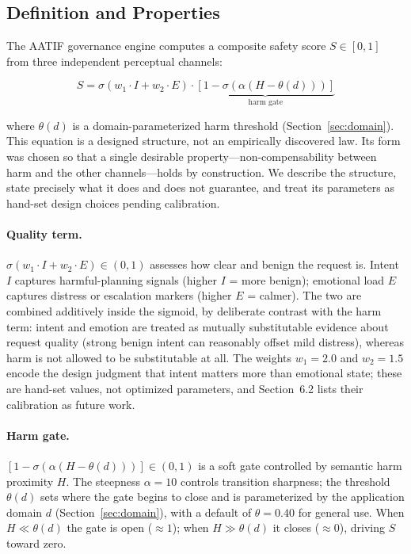 \documentclass[11pt,a4paper]{article}
\begin{document}
\subsection{Definition and Properties}

The AATIF governance engine computes a composite safety score $S \in [0,1]$ from three independent perceptual channels:

\begin{equation}
S = \sigma(w_1 \cdot I + w_2 \cdot E) \cdot \underbrace{[1 - \sigma(\alpha(H - \theta(d)))]}_{\text{harm gate}}
\label{eq:s_equation}
\end{equation}

\noindent where $\theta(d)$ is a domain-parameterized harm threshold (Section~\ref{sec:domain}). This equation is a designed structure, not an empirically discovered law. Its form was chosen so that a single desirable property---non-compensability between harm and the other channels---holds by construction. We describe the structure, state precisely what it does and does not guarantee, and treat its parameters as hand-set design choices pending calibration.

\paragraph{Quality term.} $\sigma(w_1 \cdot I + w_2 \cdot E) \in (0,1)$ assesses how clear and benign the request is. Intent $I$ captures harmful-planning signals (higher $I$ = more benign); emotional load $E$ captures distress or escalation markers (higher $E$ = calmer). The two are combined additively inside the sigmoid, by deliberate contrast with the harm term: intent and emotion are treated as mutually substitutable evidence about request quality (strong benign intent can reasonably offset mild distress), whereas harm is not allowed to be substitutable at all. The weights $w_1 = 2.0$ and $w_2 = 1.5$ encode the design judgment that intent matters more than emotional state; these are hand-set values, not optimized parameters, and Section~6.2 lists their calibration as future work.

\paragraph{Harm gate.} $[1 - \sigma(\alpha(H - \theta(d)))] \in (0,1)$ is a soft gate controlled by semantic harm proximity $H$. The steepness $\alpha = 10$ controls transition sharpness; the threshold $\theta(d)$ sets where the gate begins to close and is parameterized by the application domain $d$ (Section~\ref{sec:domain}), with a default of $\theta = 0.40$ for general use. When $H \ll \theta(d)$ the gate is open ($\approx 1$); when $H \gg \theta(d)$ it closes ($\approx 0$), driving $S$ toward zero.
\end{document}
